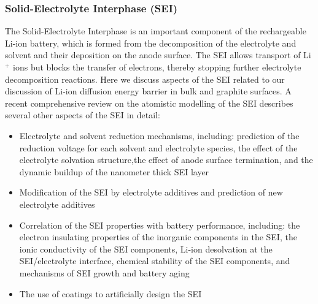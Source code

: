 \documentclass[../main.tex]{subfiles}
\begin{document}
\subsubsection{Solid-Electrolyte Interphase (SEI)}
\label{sec:SEI}
The Solid-Electrolyte Interphase is an important component of the rechargeable Li-ion battery, which is formed from the decomposition of the electrolyte and solvent and their deposition on the anode surface. The SEI allows transport of Li$^+$ ions but blocks the transfer of electrons, thereby stopping further electrolyte decomposition reactions.\cite{Winter2009, VERMA20106332} Here we discuss aspects of the SEI related to our discussion of Li-ion diffusion energy barrier in bulk and graphite surfaces. A recent comprehensive review on the atomistic modelling of the SEI describes several other aspects of the SEI in detail:\cite{Wang2018} 
\begin{itemize}
    \item Electrolyte and solvent reduction mechanisms, including: prediction of the reduction voltage for each solvent and electrolyte species, the effect of the electrolyte solvation structure,the effect of anode surface termination, and the dynamic buildup of the nanometer thick SEI layer
    \item Modification of the SEI by electrolyte additives and prediction of new electrolyte additives 
    \item Correlation of the SEI properties with battery performance, including: the electron insulating properties of the inorganic components in the SEI, the ionic conductivity of the SEI components, Li-ion desolvation at the SEI/electrolyte interface, chemical stability of the SEI components, and mechanisms of SEI growth and battery aging
    \item The use of coatings to artificially design the SEI
\end{itemize}
\end{document}
